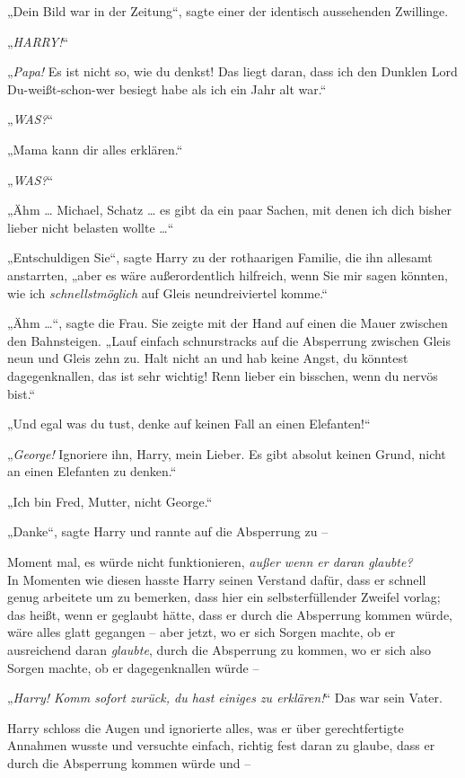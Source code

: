 {„Dein Bild war in der Zeitung“, sagte einer der identisch aussehenden Zwillinge.

„\emph{HARRY!}“

„\emph{Papa!} Es ist nicht so, wie du denkst! Das liegt daran, dass ich den Dunklen Lord Du-weißt-schon-wer besiegt habe als ich ein Jahr alt war.“

„\emph{WAS?}“

„Mama kann dir alles erklären.“

„\emph{WAS?}“

„Ähm … Michael, Schatz … es gibt da ein paar Sachen, mit denen ich dich bisher lieber nicht belasten wollte …“

„Entschuldigen Sie“, sagte Harry zu der rothaarigen Familie, die ihn allesamt anstarrten, „aber es wäre außerordentlich hilfreich, wenn Sie mir sagen könnten, wie ich \emph{schnellstmöglich} auf Gleis neundreiviertel komme.“

„Ähm …“, sagte die Frau. Sie zeigte mit der Hand auf einen die Mauer zwischen den Bahnsteigen. „Lauf einfach schnurstracks auf die Absperrung zwischen Gleis neun und Gleis zehn zu. Halt nicht an und hab keine Angst, du könntest dagegenknallen, das ist sehr wichtig! Renn lieber ein bisschen, wenn du nervös bist.“

„Und egal was du tust, denke auf keinen Fall an einen Elefanten!“

„\emph{George!} Ignoriere ihn, Harry, mein Lieber. Es gibt absolut keinen Grund, nicht an einen Elefanten zu denken.“

„Ich bin Fred, Mutter, nicht George.“

„Danke“, sagte Harry und rannte auf die Absperrung zu --

Moment mal, es würde nicht funktionieren, \emph{außer wenn er daran glaubte?}\\ In Momenten wie diesen hasste Harry seinen Verstand dafür, dass er schnell genug arbeitete um zu bemerken, dass hier ein selbsterfüllender Zweifel vorlag; das heißt, wenn er geglaubt hätte, dass er durch die Absperrung kommen würde, wäre alles glatt gegangen -- aber jetzt, wo er sich Sorgen machte, ob er ausreichend daran \emph{glaubte}, durch die Absperrung zu kommen, wo er sich also Sorgen machte, ob er dagegenknallen würde --

„\emph{Harry! Komm sofort zurück, du hast einiges zu erklären!}“ Das war sein Vater.

Harry schloss die Augen und ignorierte alles, was er über gerechtfertigte Annahmen wusste und versuchte einfach, richtig fest daran zu glaube, dass er durch die Absperrung kommen würde und --

}
